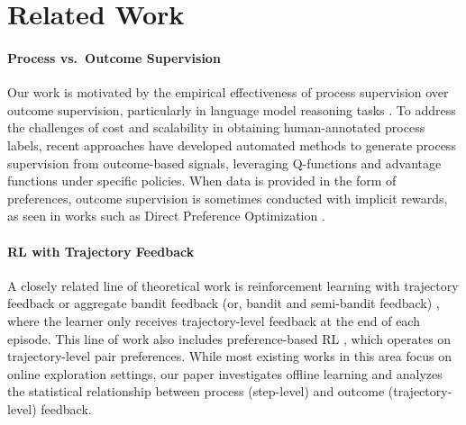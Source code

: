 \section{Related Work}\label{sec: app-related-work}

\paragraph{Process vs.~Outcome Supervision}
Our work is motivated by the empirical effectiveness of process supervision over outcome supervision, particularly in language model reasoning tasks \citep{cobbe2021training,uesato2022solving,lightman2023let}.
To address the challenges of cost and scalability in obtaining human-annotated process labels, recent approaches \citep{wang2024math,luo2024improve,setlur2024rewarding} have developed automated methods to generate process supervision from outcome-based signals, leveraging Q-functions and advantage functions under specific policies.
When data is provided in the form of preferences, outcome supervision is sometimes conducted with implicit rewards, as seen in works such as Direct Preference Optimization \citep{rafailov2023direct,lambert2024rewardbench,zhong2024dpo,yuan2024free}.


\paragraph{RL with Trajectory Feedback}
A closely related line of theoretical work is reinforcement learning with trajectory feedback or aggregate bandit feedback (or, bandit and semi-bandit feedback) \citep{neu2013efficient,efroni2021reinforcement,chatterji2021theory,chen2022human,cassel2024near,lancewicki2025near}, where the learner only receives trajectory-level feedback at the end of each episode. This line of work also includes preference-based RL \citep{pacchiano2021dueling,zhu2023principled,wu2023making,zhan2023provable}, which operates on trajectory-level pair preferences. While most existing works in this area focus on online exploration settings, our paper investigates offline learning and analyzes the statistical relationship between process (step-level) and outcome (trajectory-level) feedback.


